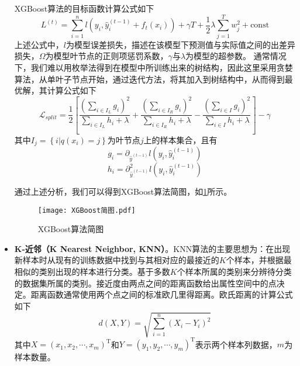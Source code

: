 \documentclass{MathorCupmodeling}
\begin{document}
\begin{itemize}
		XGBoost算法的目标函数计算公式如下
		\begin{equation}
			L^{\left(t\right)}=\sum\limits_{i=1}^{n}l\left(y_i,\hat{y}_{i}^{\left(t-1\right)}+f_t\left(x_i\right)\right)+\gamma T+\frac{1}{2}\lambda\sum\limits_{j=1}^T{w_j^2}+\mathrm{const} \label{fXGBoostL}
		\end{equation}
		上述公式中，$l$为模型误差损失，描述在该模型下预测值与实际值之间的出差异损失，$\Omega$为模型叶节点的正则项惩罚系数，$\gamma$与$\lambda$为模型的超参数\textcolor{blue}{\cite{pxgboost2}}。
		通常情况下，我们难以用枚举法得到在模型中所训练出来的树结构，因此这里采用贪婪算法，从单叶子节点开始，通过迭代方法，将其加入到树结构中，从而得到最优解，其计算公式\textcolor{blue}{\cite{pxgboost3}}如下
		\begin{equation}
			\mathcal{L}_{split}=\frac{1}{2}\left[\frac{\left(\sum_{i\in I_L}g_i\right)^2}{\sum_{i\in I_L}h_i+\lambda}+\frac{\left(\sum_{i\in I_R}g_i\right)^2}{\sum_{i\in I_R}h_i+\lambda}-\frac{\left(\sum_{i\in I}g_i\right)^2}{\sum_{i\in I}h_i+\lambda}\right]-\gamma \label{fXGBoostLsplit}
		\end{equation}
		其中$I_j=\left\{i|q\left(x_i\right)=j\right\}$为叶节点$j$上的样本集合\textcolor{blue}{\cite{pxgboost2}}，且有
		\begin{equation}
			g_i=\partial_{\hat{y}^{\left(t-1\right)}}l\left(y_i,\hat{y}_i^{\left(t-1\right)}\right)
		\end{equation}
		\begin{equation}
			h_i=\partial_{\hat{y}^{\left(t-1\right)}}^2l\left(y_i,\hat{y}_i^{\left(t-1\right)}\right) \label{xgboosthi}
		\end{equation}
	
		通过上述分析，我们可以得到XGBoost算法简图，如\textcolor{blue}{\cref{fig:XGBoost}}所示。
		\begin{figure}[h!t]
			\centerline{\texttt{[image: XGBoost简图.pdf]}}
			\caption{XGBoost算法简图}\label{fig:XGBoost}
		\end{figure}
		\item \textbf{K-近邻（K Nearest Neighbor, KNN）}。KNN算法的主要思想为：在出现新样本时从现有的训练数据中找到与其相对应的最接近的$K$个样本，并根据最相似的类别出现的样本进行分类。基于多数$K$个样本所属的类别来分辨待分类的数据集所属的类别\textcolor{blue}{\cite{pknn}}。接近度由两点之间的距离函数给出属性空间中的点决定。距离函数通常使用两个点之间的标准欧几里得距离。欧氏距离的计算公式如下
		\begin{equation}
			d(X, Y)=\sqrt{\sum\limits_{i=1}^{n}\left(X_{i}-Y_{i}\right)^{2}} \label{fdistance}
		\end{equation}
		其中$X=\left(x_{1},x_{2},\cdots,x_{m}\right)^{\mathrm{T}}$和$Y=\left(y_{1},y_{2},\cdots,y_{m}\right)^{\mathrm{T}}$表示两个样本列数据，$m$为样本数量。
		

\end{itemize}
\end{document}
